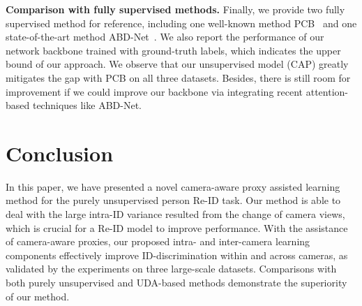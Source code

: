 \documentclass[letterpaper]{article} \usepackage{aaai21}  \usepackage{times}  \usepackage{helvet} \usepackage{courier}  \usepackage[hyphens]{url}  \usepackage{graphicx} \usepackage{subcaption}
\begin{document}
\textbf{Comparison with fully supervised methods.} Finally, we provide two fully supervised method for reference, including one well-known method PCB~\cite{sun2018beyond} and one state-of-the-art method ABD-Net~\cite{chen2019abd}. We also report the performance of our network backbone trained with ground-truth labels, which indicates the upper bound of our approach. We observe that our unsupervised model (CAP) greatly mitigates the gap with PCB on all three datasets. Besides, there is still room for improvement if we could improve our backbone via integrating recent attention-based techniques like ABD-Net. 



\section{Conclusion}
In this paper, we have presented a novel camera-aware proxy assisted learning method for the purely unsupervised person Re-ID task. Our method is able to deal with the large intra-ID variance resulted from the change of camera views, which is crucial for a Re-ID model to improve performance. With the assistance of camera-aware proxies, our proposed intra- and inter-camera learning components effectively improve ID-discrimination within and across cameras, as validated by the experiments on three large-scale datasets. Comparisons with both purely unsupervised and UDA-based methods demonstrate the superiority of our method.






\end{document}
